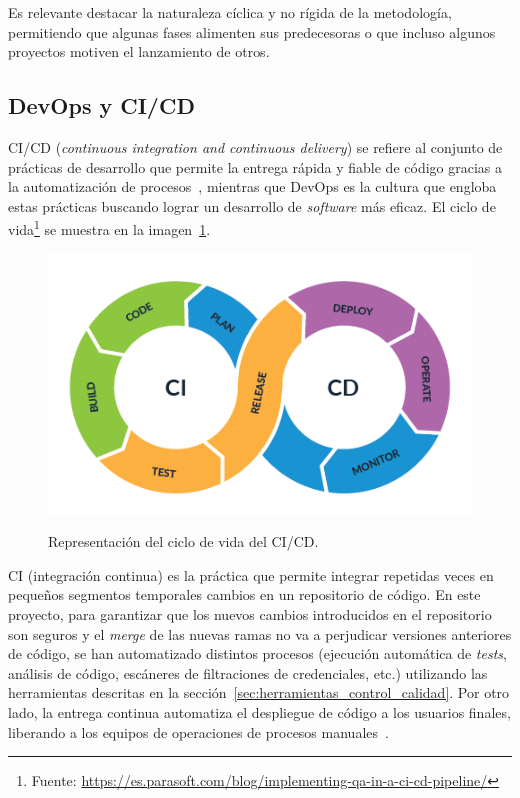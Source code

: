 Es relevante destacar la naturaleza cíclica y no rígida de la metodología, permitiendo que algunas fases alimenten sus predecesoras o que incluso algunos proyectos motiven el lanzamiento de otros.

\subsection{DevOps y CI/CD}

CI/CD (\textit{continuous integration and continuous delivery}) se refiere al conjunto de prácticas de desarrollo que permite la entrega rápida y fiable de código gracias a la automatización de procesos~\cite{cdciUnity}, mientras que DevOps es la cultura que engloba estas prácticas buscando lograr un desarrollo de \textit{software} más eficaz. El ciclo de vida\footnote{Fuente: \url{https://es.parasoft.com/blog/implementing-qa-in-a-ci-cd-pipeline/}} se muestra en la imagen~\ref{img:4_cicd}.

\begin{figure}[h]
	\caption[Técnicas: Ciclo de vida del CI/CD]{Representación del ciclo de vida del CI/CD.}
	\centering
	\includegraphics[scale=0.6]{../img/memoria/4_cicd.png}
	\label{img:4_cicd}
\end{figure}


CI (integración continua) es la práctica que permite integrar repetidas veces en pequeños segmentos temporales cambios en un repositorio de código. En este proyecto, para garantizar que los nuevos cambios introducidos en el repositorio son seguros y el \textit{merge} de las nuevas ramas no va a perjudicar versiones anteriores de código, se han automatizado distintos procesos (ejecución automática de \textit{tests}, análisis de código, escáneres de filtraciones de credenciales, etc.) utilizando las herramientas descritas en la sección~\ref{sec:herramientas_control_calidad}. Por otro lado, la entrega continua automatiza el despliegue de código a los usuarios finales, liberando a los equipos de operaciones de procesos manuales~\cite{cdciRedHat}. 

